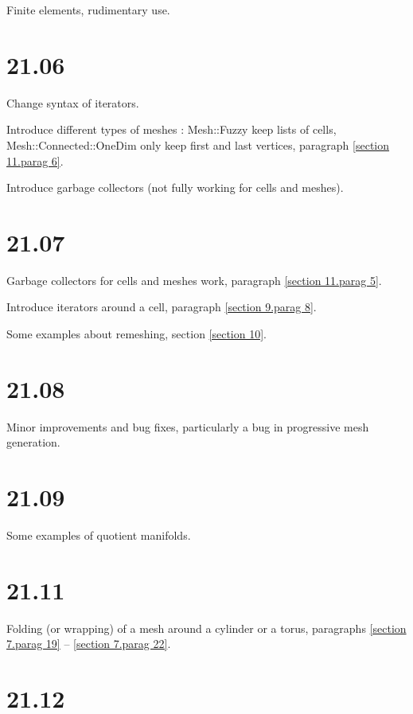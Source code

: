 \documentclass[a4paper]{scrreprt}
\def\numb{}
\newcommand\verm[1]{\textcolor{manif}{#1}}
\renewcommand\tt{\normalfont\ttfamily}
\begin{document}
\noindent Finite elements, rudimentary use.


\section*{21.06}

\noindent Change syntax of iterators.

\noindent Introduce different types of meshes :
{\small\tt\verm{Mesh}::Fuzzy} keep lists of cells,
{\small\tt\verm{Mesh}::Connected::OneDim} only keep first and last vertices,
paragraph \ref{\numb section 11.\numb parag 6}.

\noindent Introduce garbage collectors (not fully working for cells and meshes).


\section*{21.07}

\noindent Garbage collectors for cells and meshes work,
paragraph \ref{\numb section 11.\numb parag 5}.

\noindent Introduce iterators around a cell, paragraph \ref{\numb section 9.\numb parag 8}.

\noindent Some examples about remeshing, section \ref{\numb section 10}.


\section*{21.08}

\noindent Minor improvements and bug fixes, particularly a bug in progressive mesh generation.


\section*{21.09}

\noindent Some examples of quotient manifolds.


\section*{21.11}

\noindent Folding (or wrapping) of a mesh around a cylinder or a torus, paragraphs
\ref{\numb section 7.\numb parag 19} -- \ref{\numb section 7.\numb parag 22}.


\section*{21.12}
\end{document}
